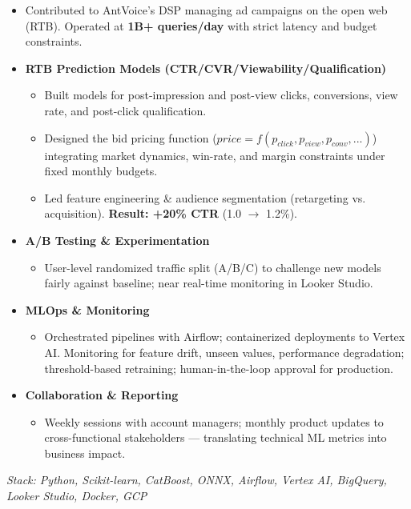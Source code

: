 \documentclass[10pt,a4paper]{altacv}
\begin{document}
\begin{itemize}
  \item Contributed to AntVoice's DSP managing ad campaigns on the open web (RTB). Operated at \textbf{1B+ queries/day} with strict latency and budget constraints.
  \item \textbf{RTB Prediction Models (CTR/CVR/Viewability/Qualification)}
  \begin{itemize}
    \item Built models for post-impression and post-view clicks, conversions, view rate, and post-click qualification.
    \item Designed the bid pricing function \small($price=f(p_{click},p_{view},p_{conv},...)$\small) integrating market dynamics, win-rate, and margin constraints under fixed monthly budgets.
    \item Led feature engineering \& audience segmentation (retargeting vs. acquisition). \textbf{Result: +20\% CTR} (1.0 $\rightarrow$ 1.2\%).
  \end{itemize}
  \item \textbf{A/B Testing \& Experimentation}
  \begin{itemize}
    \item User-level randomized traffic split (A/B/C) to challenge new models fairly against baseline; near real-time monitoring in Looker Studio.
  \end{itemize}
  \item \textbf{MLOps \& Monitoring}
  \begin{itemize}
    \item Orchestrated pipelines with Airflow; containerized deployments to Vertex AI. Monitoring for feature drift, unseen values, performance degradation; threshold-based retraining; human-in-the-loop approval for production.
  \end{itemize}
  \item \textbf{Collaboration \& Reporting}
  \begin{itemize}
    \item Weekly sessions with account managers; monthly product updates to cross-functional stakeholders — translating technical ML metrics into business impact.
  \end{itemize}
\end{itemize}
\textit{Stack: Python, Scikit-learn, CatBoost, ONNX, Airflow, Vertex AI, BigQuery, Looker Studio, Docker, GCP}
\end{document}
